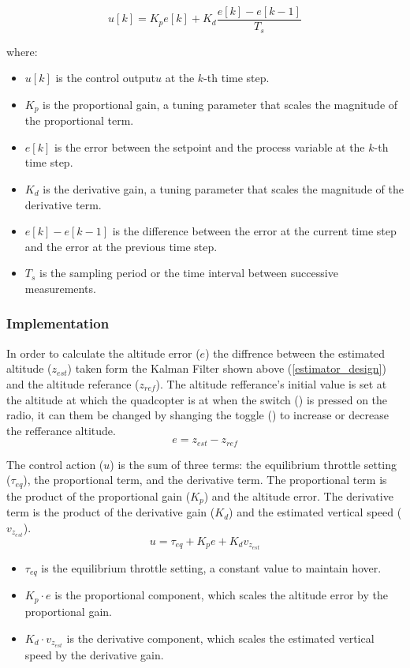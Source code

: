\documentclass{report}
\begin{document}
\begin{equation}
  u[k] = K_p e[k] + K_d \frac{e[k] - e[k-1]}{T_s}
\end{equation}

where:
\begin{itemize}
  \item $u[k]$ is the control output\(u\) at the $k$-th time step.
  \item $K_p$ is the proportional gain, a tuning parameter that scales the
  magnitude of the proportional term.
  \item $e[k]$ is the error between the setpoint and the process variable at the $k$-th time step.
  \item $K_d$ is the derivative gain, a tuning parameter that scales the
  magnitude of the derivative term.
  \item $e[k] - e[k-1]$ is the difference between the error at the current time step and the error at the previous time step.
  \item  $T_s$ is the sampling period or the time interval between successive measurements.
\end{itemize}

\subsubsection*{Implementation}
In order to calculate the altitude error (\(e\)) the diffrence between the
estimated altitude (\(z_{est}\)) taken form the Kalman Filter shown above
(\ref{estimator_design}) and the altitude referance (\(z_{ref}\)). The altitude
refferance's initial value is set at the altitude at which the quadcopter is at
when the switch () is pressed on the radio, it can them be changed by shanging
the toggle () to increase or decrease the refferance altitude.
\begin{equation}
  e = z_{est} - z_{ref}
\end{equation}

The control action (\(u\)) is the sum of three terms: the equilibrium throttle
setting (\(\tau_{eq}\)), the proportional term, and the derivative term. The
proportional term is the product of the proportional gain (\(K_p\)) and the
altitude error. The derivative term is the product of the derivative gain
(\(K_d\)) and the estimated vertical speed (\(v_{z_{est}}\)).
\begin{equation}\label{PD_controller_eq}
  u = \tau_{eq} + K_p e + K_d v_{z_{est}}
\end{equation}
\begin{itemize}
  \item \(\tau_{eq}\) is the equilibrium throttle setting, a constant value to
  maintain hover.
  \item \(K_p \cdot e\) is the proportional component, which scales the altitude
  error by the proportional gain.
  \item \(K_d \cdot v_{z_{est}}\) is the derivative component, which scales the
  estimated vertical speed by the derivative gain.
\end{itemize}
\end{document}
